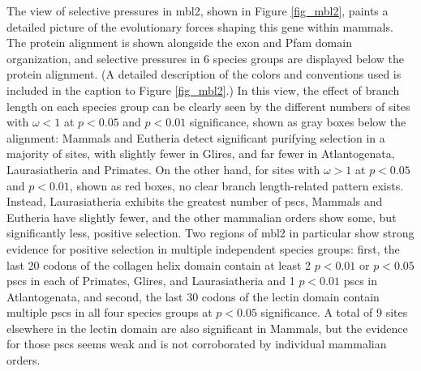 The \sw view of selective pressures in \ac{mbl2}, shown in Figure
\ref{fig_mbl2}, paints a detailed picture of the evolutionary forces
shaping this gene within mammals. The protein alignment is shown
alongside the exon and Pfam domain organization, and \sw selective
pressures in 6 species groups are displayed below the protein
alignment. (A detailed description of the colors and conventions used
is included in the caption to Figure \ref{fig_mbl2}.) In this view,
the effect of branch length on each species group can be clearly seen
by the different numbers of sites with $\omega<1$ at $p<0.05$ and
$p<0.01$ significance, shown as gray boxes below the alignment:
Mammals and Eutheria detect significant purifying selection in a
majority of sites, with slightly fewer in Glires, and far fewer in
Atlantogenata, Laurasiatheria and Primates. On the other hand, for
sites with $\omega>1$ at $p<0.05$ and $p<0.01$, shown as red boxes, no
clear branch length-related pattern exists. Instead, Laurasiatheria
exhibits the greatest number of \acp{psc}, Mammals and Eutheria have
slightly fewer, and the other mammalian orders show some, but
significantly less, positive selection. Two regions of \ac{mbl2} in
particular show strong evidence for positive selection in multiple
independent species groups: first, the last 20 codons of the collagen
helix domain contain at least 2 $p<0.01$ or $p<0.05$ \acp{psc} in each
of Primates, Glires, and Laurasiatheria and 1 $p<0.01$ \acp{psc} in
Atlantogenata, and second, the last 30 codons of the lectin domain
contain multiple \acp{psc} in all four species groups at $p<0.05$
significance. A total of 9 sites elsewhere in the lectin domain are
also significant in Mammals, but the evidence for those \acp{psc}
seems weak and is not corroborated by individual mammalian orders.

